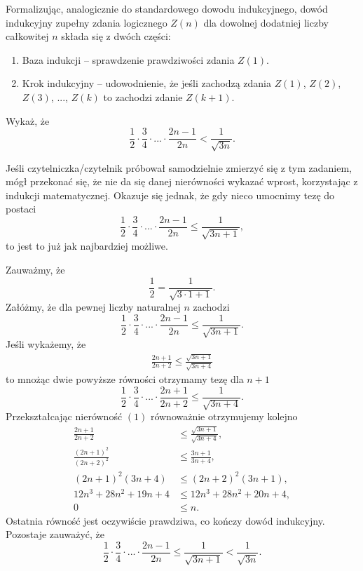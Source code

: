\noindent
Formalizując, analogicznie do standardowego dowodu indukcyjnego, dowód indukcyjny zupełny zdania logicznego $Z(n)$ dla dowolnej dodatniej liczby całkowitej $n$ składa się z dwóch części:
\begin{enumerate}
	\item Baza indukcji -- sprawdzenie prawdziwości zdania $Z(1)$.
	\item Krok indukcyjny -- udowodnienie, że jeśli zachodzą zdania $Z(1)$, $Z(2)$, $Z(3)$, ..., $Z(k)$ to zachodzi zdanie $Z(k + 1)$.
\end{enumerate}

\vspace{10px}


\noindent
Wykaż, że
\[
	\frac{1}{2} \cdot \frac{3}{4} \cdot ... \cdot \frac{2n - 1}{2n} < \frac{1}{\sqrt{3n}}.
\]

\newpage


\noindent
Jeśli czytelniczka/czytelnik próbował samodzielnie zmierzyć się z tym zadaniem, mógł przekonać się, że nie da się danej nierówności wykazać wprost, korzystając z indukcji matematycznej. Okazuje się jednak, że gdy nieco umocnimy tezę do postaci
\[
	\frac{1}{2} \cdot \frac{3}{4} \cdot ... \cdot \frac{2n - 1}{2n} \leqslant \frac{1}{\sqrt{3n + 1}},
\]
to jest to już jak najbardziej możliwe.

\vspace{10px}
\noindent
Zauważmy, że
\[
	\frac{1}{2} = \frac{1}{\sqrt{3\cdot 1 + 1}}.
\]
Załóżmy, że dla pewnej liczby naturalnej $n$ zachodzi 
\[
	\frac{1}{2} \cdot \frac{3}{4} \cdot ... \cdot \frac{2n - 1}{2n} \leqslant \frac{1}{\sqrt{3n + 1}}.
\]
Jeśli wykażemy, że 
\begin{gather}
	\frac{2n + 1}{2n + 2} \leqslant \frac{\sqrt{3n + 1}}{\sqrt{3n + 4}}
\end{gather}
to mnożąc dwie powyższe równości otrzymamy tezę dla $n + 1$
\[
	\frac{1}{2} \cdot \frac{3}{4} \cdot ... \cdot \frac{2n + 1}{2n + 2} \leqslant \frac{1}{\sqrt{3n + 4}}.
\]
Przekształcając nierówność $(1)$ równoważnie otrzymujemy kolejno
\begin{align*}	
	\frac{2n + 1}{2n + 2} &\leqslant \frac{\sqrt{3n + 1}}{\sqrt{3n + 4}},\\
	\frac{(2n + 1)^2}{(2n + 2)^2} &\leqslant \frac{3n + 1}{3n + 4},\\
	(2n + 1)^2(3n + 4) &\leqslant (2n + 2)^2(3n + 1), \\
	12n^3 + 28n^2 + 19n + 4 &\leqslant  12n^3 + 28n^2 + 20n + 4, \\
	0 &\leqslant n.
\end{align*}
Ostatnia równość jest oczywiście prawdziwa, co kończy dowód indukcyjny. Pozostaje zauważyć, że
\[
	\frac{1}{2} \cdot \frac{3}{4} \cdot ... \cdot \frac{2n - 1}{2n} \leqslant \frac{1}{\sqrt{3n + 1}} < \frac{1}{\sqrt{3n}}.
\]

